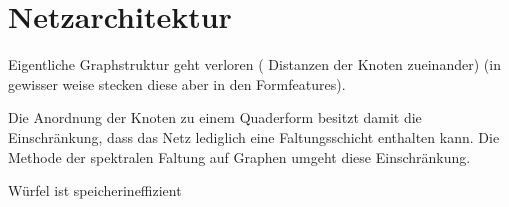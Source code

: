 \section{Netzarchitektur}
\label{raeumliche_netzarchitektur}




Eigentliche Graphstruktur geht verloren (\zB{} Distanzen der Knoten zueinander) (in gewisser weise stecken diese aber in den Formfeatures).

Die Anordnung der Knoten zu einem Quaderform besitzt damit die Einschränkung, dass das Netz lediglich eine Faltungsschicht enthalten kann.
Die Methode der spektralen Faltung auf Graphen umgeht diese Einschränkung.

Würfel ist speicherineffizient
